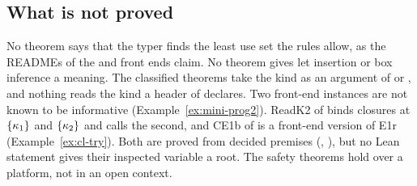 \subsection{What is not proved}\label{sec:fe-open}

No theorem says that the typer finds the least use set the rules allow, as the READMEs of the \treeK and \treeCL front ends claim. No theorem gives let insertion or box inference a meaning. The classified theorems take the kind as an argument of  or , and nothing reads the kind a header of \treeCL declares. Two front-end instances are not known to be informative (Example~\ref{ex:mini-prog2}). ReadK2 of \treeCC binds closures at $\{\kappa_1\}$ and $\{\kappa_2\}$ and calls the second, and CE1b of \treeCL is a front-end version of E1r (Example~\ref{ex:cl-try}). Both are proved from decided premises (, ), but no Lean statement gives their inspected variable a root. The safety theorems hold over a platform, not in an open context.
